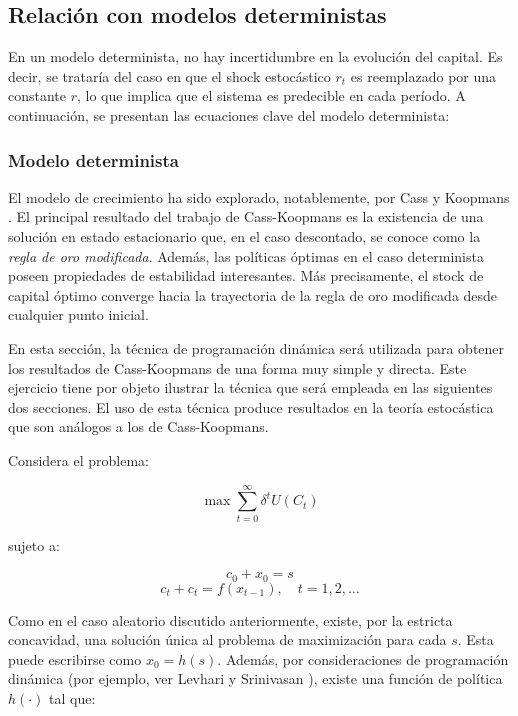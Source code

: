 \documentclass[a4paper,12pt]{article}
\begin{document}
	\subsection{Relación con modelos deterministas}
	En un modelo determinista, no hay incertidumbre en la evolución del capital. Es decir, se trataría del caso en que el shock estocástico \(r_t\) es reemplazado por una constante \(r\), lo que implica que el sistema es predecible en cada período. A continuación, se presentan las ecuaciones clave del modelo determinista:
	
	\subsubsection{Modelo determinista}
	El modelo de crecimiento ha sido explorado, notablemente, por Cass \cite{cass} y Koopmans \cite{koopmans}.  
	El principal resultado del trabajo de Cass-Koopmans es la existencia de una solución en estado estacionario que, en el caso descontado, se conoce como la \textit{regla de oro modificada}. 
	Además, las políticas óptimas en el caso determinista poseen propiedades de estabilidad interesantes. 
	Más precisamente, el stock de capital óptimo converge hacia la trayectoria de la regla de oro modificada desde cualquier punto inicial.
	
	En esta sección, la técnica de programación dinámica será utilizada para obtener los resultados de Cass-Koopmans de una forma muy simple y directa. 
	Este ejercicio tiene por objeto ilustrar la técnica que será empleada en las siguientes dos secciones. 
	El uso de esta técnica produce resultados en la teoría estocástica que son análogos a los de Cass-Koopmans.
	
	Considera el problema:
	
		\begin{equation}
	\max \sum_{t=0}^{\infty} \delta^t U(C_t)
		\end{equation}
	
	sujeto a:
	
		\begin{equation}
	c_0 + x_0 = s
		\end{equation}
		\begin{equation}
	c_t + c_t = f(x_{t-1}), \quad t = 1, 2, \dots
		\end{equation}
	
	Como en el caso aleatorio discutido anteriormente, existe, por la estricta concavidad, una solución única al problema de maximización para cada $s$. Esta puede escribirse como $x_0 = h(s)$. 
	Además, por consideraciones de programación dinámica (por ejemplo, ver Levhari y Srinivasan \cite{levhari}), existe una función de política $h(\cdot)$ tal que:
	
\end{document}
